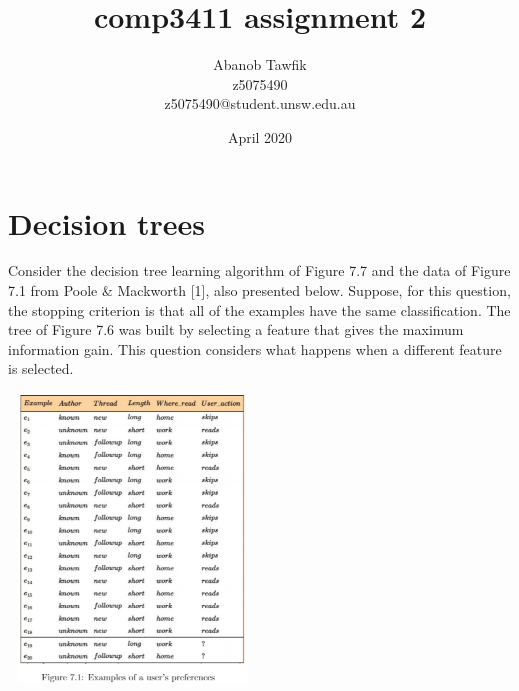 \documentclass{article}
\title{comp3411 assignment 2}
\author{Abanob Tawfik\\z5075490\\z5075490@student.unsw.edu.au }
\date{April 2020}
\begin{document}
\maketitle
\section{Decision trees}

Consider the decision tree learning algorithm of Figure 7.7 and the data of Figure 7.1
from Poole \& Mackworth [1], also presented below. Suppose, for this question, the
stopping criterion is that all of the examples have the same classification. The tree of
Figure 7.6 was built by selecting a feature that gives the maximum information gain.
This question considers what happens when a different feature is selected.

\begin{center}
\hspace*{1pt}\includegraphics[width=250px,height=290px]{dataa.png}
\end{center}
\end{document}
